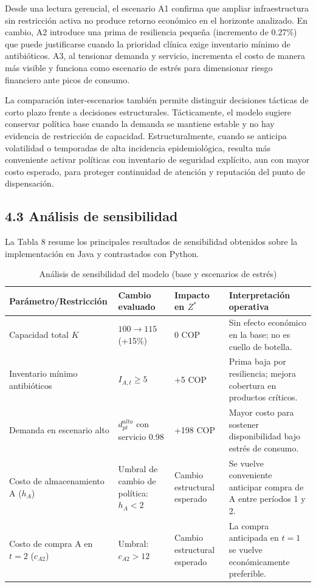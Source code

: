 \documentclass[12pt,letterpaper]{article}
\begin{document}
Desde una lectura gerencial, el escenario A1 confirma que ampliar infraestructura sin restricción activa no produce retorno económico en el horizonte analizado. En cambio, A2 introduce una prima de resiliencia pequeña (incremento de 0.27\%) que puede justificarse cuando la prioridad clínica exige inventario mínimo de antibióticos. A3, al tensionar demanda y servicio, incrementa el costo de manera más visible y funciona como escenario de estrés para dimensionar riesgo financiero ante picos de consumo.

La comparación inter-escenarios también permite distinguir decisiones tácticas de corto plazo frente a decisiones estructurales. Tácticamente, el modelo sugiere conservar política base cuando la demanda se mantiene estable y no hay evidencia de restricción de capacidad. Estructuralmente, cuando se anticipa volatilidad o temporadas de alta incidencia epidemiológica, resulta más conveniente activar políticas con inventario de seguridad explícito, aun con mayor costo esperado, para proteger continuidad de atención y reputación del punto de dispensación.

\subsection{4.3 Análisis de sensibilidad}
La Tabla 8 resume los principales resultados de sensibilidad obtenidos sobre la implementación en Java y contrastados con Python.

\begin{table}[H]
\centering
\caption{Análisis de sensibilidad del modelo (base y escenarios de estrés)}
\begin{tabular}{|p{3.8cm}|p{3.3cm}|p{3.0cm}|p{4.1cm}|}
\hline
\textbf{Parámetro/Restricción} & \textbf{Cambio evaluado} & \textbf{Impacto en $Z^*$} & \textbf{Interpretación operativa} \\
\hline
Capacidad total $K$ & $100 \rightarrow 115$ (+15\%) & 0 COP & Sin efecto económico en la base; no es cuello de botella. \\
\hline
Inventario mínimo antibióticos & $I_{A,t}\ge 5$ & +5 COP & Prima baja por resiliencia; mejora cobertura en productos críticos. \\
\hline
Demanda en escenario alto & $d_{pt}^{alta}$ con servicio 0.98 & +198 COP & Mayor costo para sostener disponibilidad bajo estrés de consumo. \\
\hline
Costo de almacenamiento A ($h_A$) & Umbral de cambio de política: $h_A<2$ & Cambio estructural esperado & Se vuelve conveniente anticipar compra de A entre períodos 1 y 2. \\
\hline
Costo de compra A en $t=2$ ($c_{A2}$) & Umbral: $c_{A2}>12$ & Cambio estructural esperado & La compra anticipada en $t=1$ se vuelve económicamente preferible. \\
\hline
\end{tabular}
\end{table}
\end{document}
